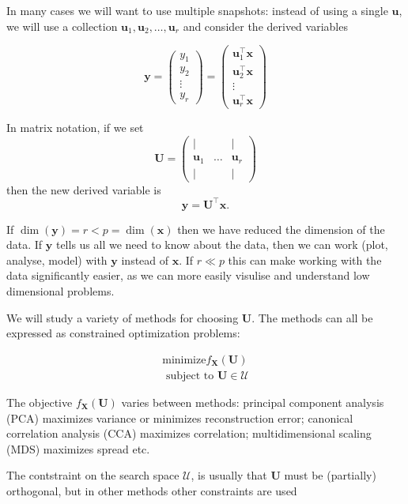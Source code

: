 \documentclass[
]{book}
\theoremstyle{definition}
\theoremstyle{definition}
\theoremstyle{definition}
\theoremstyle{definition}
\theoremstyle{remark}
\begin{document}
In many cases we will want to use multiple snapshots: instead of using a single \(\mathbf u\), we will use a collection \(\mathbf u_1, \mathbf u_2, \ldots, \mathbf u_r\) and consider the derived variables

\[\mathbf y= \begin{pmatrix} y_1\\y_2 \\ \vdots \\ y_r\end{pmatrix} = \begin{pmatrix}
\mathbf u_1^\top \mathbf x\\  \mathbf u_2^\top \mathbf x\\\vdots\\  \mathbf u_r^\top \mathbf x\end{pmatrix}\]

In matrix notation, if we set
\[\mathbf U= \begin{pmatrix} 
|&&|\\
\mathbf u_1 & \ldots & \mathbf u_r\\
|&&|\end{pmatrix}\]
then the new derived variable is
\[\mathbf y= \mathbf U^\top \mathbf x.\]

If \(\dim(\mathbf y)=r<p=\dim(\mathbf x)\) then we have reduced the dimension of the data. If \(\mathbf y\) tells us all we need to know about the data, then we can work (plot, analyse, model) with \(\mathbf y\) instead of \(\mathbf x\). If \(r\ll p\) this can make working with the data significantly easier, as we can more easily visulise and understand low dimensional problems.

We will study a variety of methods for choosing \(\mathbf U\). The methods can all be expressed as constrained optimization problems:

\begin{align}
\mbox{minimize} f_{\mathbf X}(\mathbf U) \label{eq:dimredopt} \\
\mbox{ subject to } \mathbf U\in \mathcal{U} 
\end{align}

The objective \(f_{\mathbf X}(\mathbf U)\) varies between methods: principal component analysis (PCA) maximizes variance or minimizes reconstruction error; canonical correlation analysis (CCA) maximizes correlation; multidimensional scaling (MDS) maximizes spread etc.

The contstraint on the search space \(\mathcal{U}\), is usually that \(\mathbf U\) must be (partially) orthogonal, but in other methods other constraints are used
\end{document}
